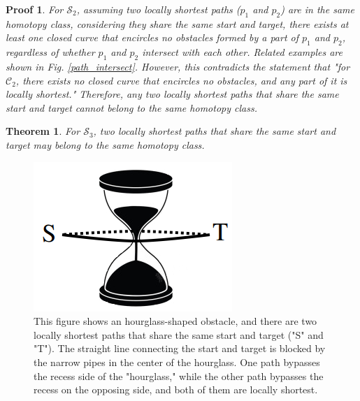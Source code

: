 \documentclass[letterpaper, 10 pt, journal, twoside]{IEEEtran}
\newtheorem{myTheo}{Theorem}
\newtheorem{myProof}{Proof}
\begin{document}
\begin{myProof}
For $\mathcal{S}_{2}$, assuming two locally shortest paths ($p_1$ and $p_2$) are in the same homotopy class, considering they share the same start and target, there exists at least one closed curve that encircles no obstacles formed by a part of $p_1$ and $p_2$, regardless of whether $p_1$ and $p_2$ intersect with each other. Related examples are shown in Fig. \ref{path_intersect}. However, this contradicts the statement that "for $\mathcal{C}_{2}$, there exists no closed curve that encircles no obstacles, and any part of it is locally shortest." Therefore, any two locally shortest paths that share the same start and target cannot belong to the same homotopy class.

\end{myProof}

\begin{myTheo}
\label{core3}
For $\mathcal{S}_{3}$, two locally shortest paths that share the same start and target may belong to the same homotopy class.

\end{myTheo}

\begin{figure}[t] \scriptsize
  \centerline{\includegraphics[width=3.cm]{example_3d.png}}
\caption{This figure shows an hourglass-shaped obstacle, and there are two locally shortest paths that share the same start and target ("S" and "T"). The straight line connecting the start and target is blocked by the narrow pipes in the center of the hourglass. One path bypasses the recess side of the "hourglass," while the other path bypasses the recess on the opposing side, and both of them are locally shortest. }
\label{example_3d}
\end{figure}
\end{document}
